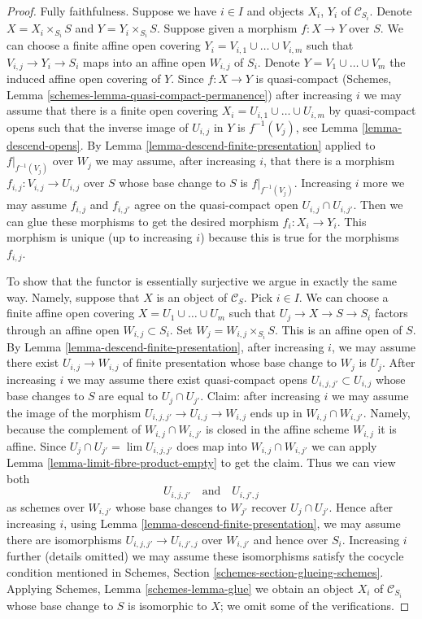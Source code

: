 \documentclass[10pt,a4paper]{amsart}
\theoremstyle{plain}
\theoremstyle{definition}
\theoremstyle{remark}
\numberwithin{equation}{subsection}
\def\lim{\mathop{\mathrm{lim}}\nolimits}
\begin{document}
\begin{proof}
Fully faithfulness. Suppose we have $i \in I$ and objects
$X_i$, $Y_i$ of $\mathcal{C}_{S_i}$. Denote
$X = X_i \times_{S_i} S$ and $Y = Y_i \times_{S_i} S$.
Suppose given a morphism $f : X \to Y$ over $S$.
We can choose a finite affine open covering
$Y_i = V_{i, 1} \cup \ldots \cup V_{i, m}$
such that $V_{i, j} \to Y_i \to S_i$ maps into an affine
open $W_{i, j}$ of $S_i$. Denote $Y = V_1 \cup \ldots \cup V_m$ the
induced affine open covering of $Y$.
Since $f : X \to Y$ is quasi-compact
(Schemes, Lemma \ref{schemes-lemma-quasi-compact-permanence})
after increasing $i$ we may assume that there is a
finite open covering $X_i = U_{i, 1} \cup \ldots \cup U_{i, m}$
by quasi-compact opens such that the inverse image of
$U_{i, j}$ in $Y$ is $f^{-1}(V_j)$, see
Lemma \ref{lemma-descend-opens}.
By Lemma \ref{lemma-descend-finite-presentation}
applied to $f|_{f^{-1}(V_j)}$ over $W_j$ we may assume, after
increasing $i$, that there is a morphism
$f_{i, j} : V_{i, j} \to U_{i, j}$ over $S$ whose base change
to $S$ is $f|_{f^{-1}(V_j)}$.
Increasing $i$ more we may assume $f_{i, j}$ and $f_{i, j'}$
agree on the quasi-compact open $U_{i, j} \cap U_{i, j'}$.
Then we can glue these morphisms to get the
desired morphism $f_i : X_i \to Y_i$.
This morphism is unique (up to increasing $i$)
because this is true for the morphisms $f_{i, j}$.

\medskip\noindent
To show that the functor is essentially surjective we argue in
exactly the same way. Namely, suppose that
$X$ is an object of $\mathcal{C}_S$. Pick $i \in I$.
We can choose a finite affine open covering
$X = U_1 \cup \ldots \cup U_m$ such that $U_j \to X \to S \to S_i$
factors through an affine open $W_{i, j} \subset S_i$.
Set $W_j = W_{i, j} \times_{S_i} S$. This is an affine open of $S$.
By Lemma \ref{lemma-descend-finite-presentation},
after increasing $i$, we may assume there exist
$U_{i, j} \to W_{i, j}$ of finite presentation
whose base change to $W_j$ is $U_j$.
After increasing $i$ we may assume there exist
quasi-compact opens $U_{i, j, j'} \subset U_{i, j}$
whose base changes to $S$ are equal to $U_j \cap U_{j'}$.
Claim: after increasing $i$ we may assume the image of the morphism
$U_{i, j, j'} \to U_{i, j} \to W_{i, j}$
ends up in $W_{i, j} \cap W_{i, j'}$.
Namely, because the complement of $W_{i, j} \cap W_{i, j'}$
is closed in the affine scheme $W_{i, j}$ it is affine.
Since $U_j \cap U_{j'} = \lim U_{i, j, j'}$ does map into
$W_{i, j} \cap W_{i, j'}$
we can apply Lemma \ref{lemma-limit-fibre-product-empty}
to get the claim. Thus we can view both
$$
U_{i, j, j'} \quad\text{and}\quad U_{i, j', j}
$$
as schemes over $W_{i, j'}$ whose base changes to $W_{j'}$
recover $U_j \cap U_{j'}$. Hence after increasing $i$, using
Lemma \ref{lemma-descend-finite-presentation},
we may assume there are isomorphisms
$U_{i, j, j'} \to U_{i, j', j}$ over $W_{i, j'}$ and hence
over $S_i$. Increasing $i$ further (details omitted)
we may assume these isomorphisms
satisfy the cocycle condition mentioned in
Schemes, Section \ref{schemes-section-glueing-schemes}.
Applying Schemes, Lemma \ref{schemes-lemma-glue}
we obtain an object $X_i$ of $\mathcal{C}_{S_i}$ whose
base change to $S$ is isomorphic to $X$; we omit some
of the verifications.
\end{proof}
\end{document}

